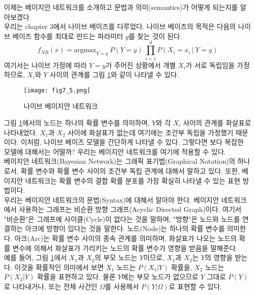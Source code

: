 \documentclass[a4paper]{oblivoir}
\begin{document}
이제는 베이지안 네트워크를 소개하고 문법과 의미(semantics)가 어떻게 되는지를 알아보겠다. \\

우리는 chapter 3에서 나이브 베이즈를 다루었다. 나이브 베이즈의 목적은 다음의 나이브 베이즈 함수를 최대로 만드는 파라미터 $y$를 찾는 것이 된다.
\begin{equation}
f_{NB}(x) = \textrm{argmax}_{Y=y} \ P(Y=y) \ \prod_{i=1}^{d} P(X_i = x_i \ | \ Y=y)
\label{eq:7-14}
\end{equation} 
여기서는 나이브 가정에 따라 $Y=y$가 주어진 상황에서 개별 $X_i$가 서로 독립임을 가정하므로, $X_i$와 $Y$ 사이의 관계를 그림 \ref{fig:7-5}와 같이 나타낼 수 있다.
\begin{figure}[ht] \centering 
\texttt{[image: fig7\_5.png]} 
\caption{나이브 베이지안 네트워크}
\label{fig:7-5}
\end{figure} 
그림 \ref{fig:7-5}에서의 노드는 하나의 확률 변수를 의미하며, $Y$와 각 $X_i$ 사이의 관계를 화살표로 나타내었다. $X_1$과 $X_2$ 사이에 화살표가 없는데 여기에는 조건부 독립을 가정했기 때문이다. 이처럼, 나이브 베이즈 모델을 간단하게 나타낼 수 있다. 그렇다면 보다 복잡한 모델에 대해서는 어떨까? 우리는 베이지안 네트워크를 여기에 적용할 수 있다.\\

베이지안 네트워크(Bayesian Network)는 그래픽 표기법(Graphical Notation)의 하나로서, 확률 변수와 확률 변수 사이의 조건부 독립 관계에 대해서 말하고 있다. 또한, 베이지안 네트워크는 확률 변수의 결합 확률 분포를 가장 확실히 나타낼 수 있는 표현 방법이다. \\ 

우리는 베이지안 네트워크의 문법(Syntax)에 대해서 알아야 한다. 베이지안 네트워크에서 사용하는 그래프는 비순환 방향 그래프(Acyclic Directed Graph)이다. 여기서 "비순환"은 그래프에 사이클(Cycle)이 없다는 것을 말하며, "방향"은 노드와 노드를 연결하는 아크에 방향이 있다는 것을 말한다. 노드(Node)는 하나의 확률 변수를 의미한다. 아크(Arc)는 확률 변수 사이의 종속 관계를 의미하며, 화살표가 나오는 노드의 확률 변수에 의해서 화살표가 가리키는 노드의 확률 변수가 영향을 받음을 말해준다. \\

예를 들어, 그림 \ref{fig:7-5}에서 $X_1$과 $X_2$의 부모 노드는 $Y$이므로, $X_1$과 $X_2$는 $Y$의 영향을 받는다. 이것을 확률적인 의미에서 보면 $X_1$ 노드는 $P(X_1|Y)$ 확률을, $X_2$ 노드는 $P(X_2|Y)$ 확률을 표현하고 있다. 물론 $Y$에는 부모 노드가 없으므로 $Y$ 그대로 $P(Y)$로 나타내거나, 또는 전체 사건인 $\Omega$를 사용해서  $P(Y|\Omega)$로 표현할 수 있다. \\
\end{document}
